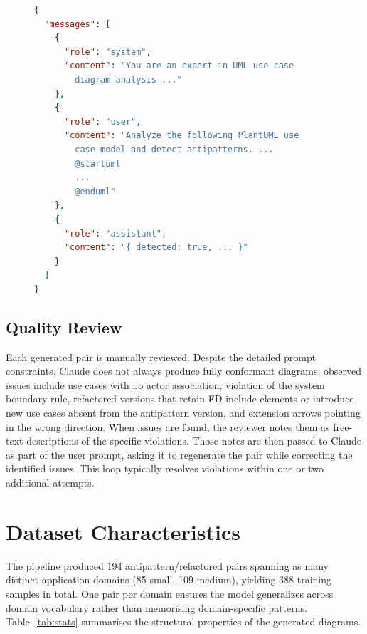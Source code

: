\documentclass[sigconf,review,anonymous]{acmart}
\begin{document}
\begin{figure}[H]
\begin{lstlisting}[language=json,
  caption={Condensed positive training sample.},
  label={lst:sample}]
{
  "messages": [
    {
      "role": "system",
      "content": "You are an expert in UML use case
        diagram analysis ..."
    },
    {
      "role": "user",
      "content": "Analyze the following PlantUML use
        case model and detect antipatterns. ...
        @startuml
        ...
        @enduml"
    },
    {
      "role": "assistant",
      "content": "{ detected: true, ... }"
    }
  ]
}
\end{lstlisting}
\end{figure}

\subsection{Quality Review}
\label{sec:review}

Each generated pair is manually reviewed.  Despite the detailed prompt constraints,
Claude does not always produce fully conformant diagrams; observed issues
include use cases with no actor association, violation of the system
boundary rule, refactored versions that retain FD-include elements or
introduce new use cases absent from the antipattern version, and extension
arrows pointing in the wrong direction.  When issues are found, the
reviewer notes them as free-text descriptions of the specific violations.
Those notes are then passed to Claude as part of the user prompt, asking it
to regenerate the pair while correcting the identified issues.  This loop
typically resolves violations within one or two additional attempts.


\section{Dataset Characteristics}
\label{sec:dataset}

The pipeline produced 194 antipattern/refactored pairs spanning as many distinct
application domains (85 small, 109 medium), yielding 388 training samples in total.
One pair per domain ensures the model generalizes across domain
vocabulary rather than memorising domain-specific patterns.
Table~\ref{tab:stats} summarises the structural properties of the generated
diagrams.
\end{document}
